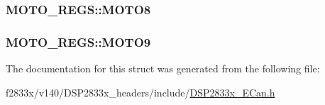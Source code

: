 \subsubsection[{M\+O\+T\+O8}]{ M\+O\+T\+O\+\_\+\+R\+E\+G\+S\+::\+M\+O\+T\+O8}\label{struct_m_o_t_o___r_e_g_s_a35540dac20b32a125bebf7089560709a}
\hypertarget{struct_m_o_t_o___r_e_g_s_aa53a74ee3a93e8493b81b27be5948963}{}
\subsubsection[{M\+O\+T\+O9}]{ M\+O\+T\+O\+\_\+\+R\+E\+G\+S\+::\+M\+O\+T\+O9}\label{struct_m_o_t_o___r_e_g_s_aa53a74ee3a93e8493b81b27be5948963}


The documentation for this struct was generated from the following file\+:\begin{DoxyCompactItemize}
\item 
f2833x/v140/\+D\+S\+P2833x\+\_\+headers/include/\hyperlink{_d_s_p2833x___e_can_8h}{D\+S\+P2833x\+\_\+\+E\+Can.\+h}\end{DoxyCompactItemize}
